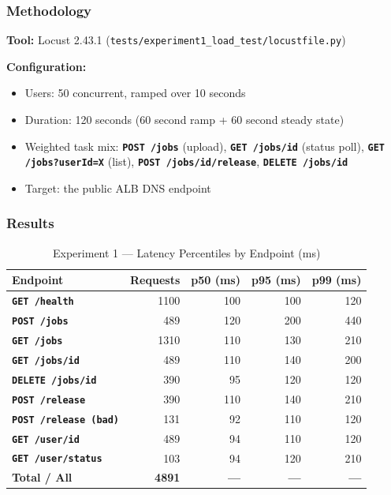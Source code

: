 \documentclass[11pt,letterpaper]{article}
\newcommand{\code}[1]{\texttt{\small #1}}
\newcommand{\http}[1]{\textbf{\texttt{#1}}}
\begin{document}
\subsubsection{Methodology}
\textbf{Tool:} Locust 2.43.1 (\code{tests/experiment1\_load\_test/locustfile.py})

\textbf{Configuration:}
\begin{itemize}[noitemsep]
  \item Users: 50 concurrent, ramped over 10 seconds
  \item Duration: 120 seconds (60 second ramp + 60 second steady state)
  \item Weighted task mix: \http{POST /jobs} (upload), \http{GET /jobs/{id}} (status poll), \http{GET /jobs?userId=X} (list), \http{POST /jobs/{id}/release}, \http{DELETE /jobs/{id}}
  \item Target: the public ALB DNS endpoint
\end{itemize}

\subsubsection{Results}

\begin{table}[H]
\centering
\caption{Experiment 1 --- Latency Percentiles by Endpoint (ms)}
\begin{tabular}{@{}lrrrr@{}}
\toprule
\textbf{Endpoint} & \textbf{Requests} & \textbf{p50 (ms)} & \textbf{p95 (ms)} & \textbf{p99 (ms)} \\
\midrule
\http{GET /health}           & 1100 & 100 & 100 & 120 \\
\http{POST /jobs}            &  489 & 120 & 200 & 440 \\
\http{GET /jobs}             & 1310 & 110 & 130 & 210 \\
\http{GET /jobs/{id}}        &  489 & 110 & 140 & 200 \\
\http{DELETE /jobs/{id}}     &  390 &  95 & 120 & 120 \\
\http{POST /release}         &  390 & 110 & 140 & 210 \\
\http{POST /release (bad)}   &  131 &  92 & 110 & 120 \\
\http{GET /user/{id}}        &  489 &  94 & 110 & 120 \\
\http{GET /user/status}      &  103 &  94 & 120 & 210 \\
\midrule
\textbf{Total / All}         & \textbf{4891} & \textbf{---} & \textbf{---} & \textbf{---} \\
\bottomrule
\end{tabular}
\end{table}
\end{document}
